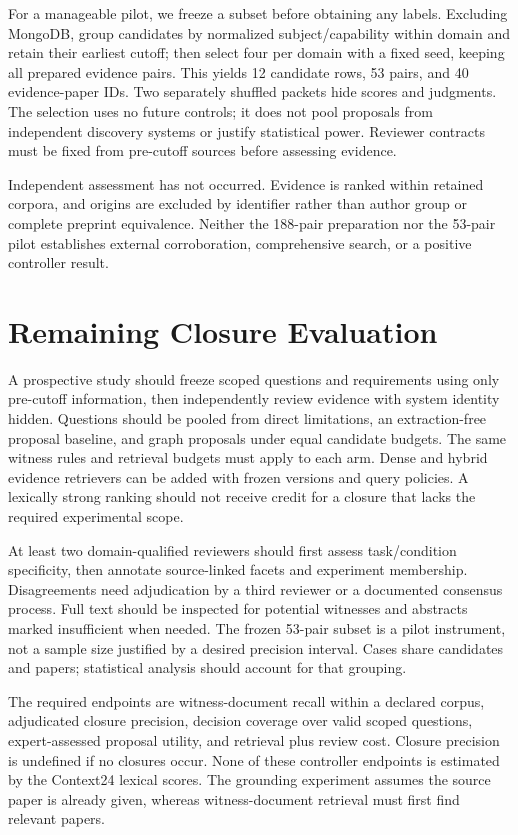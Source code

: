 \documentclass[runningheads]{llncs}
\begin{document}
For a manageable pilot, we freeze a subset before obtaining any labels. Excluding MongoDB, group candidates by normalized subject/capability within domain and retain their earliest cutoff; then select four per domain with a fixed seed, keeping all prepared evidence pairs. This yields 12 candidate rows, 53 pairs, and 40 evidence-paper IDs. Two separately shuffled packets hide scores and judgments. The selection uses no future controls; it does not pool proposals from independent discovery systems or justify statistical power. Reviewer contracts must be fixed from pre-cutoff sources before assessing evidence.

Independent assessment has not occurred. Evidence is ranked within retained corpora, and origins are excluded by identifier rather than author group or complete preprint equivalence. Neither the 188-pair preparation nor the 53-pair pilot establishes external corroboration, comprehensive search, or a positive controller result.

\section{Remaining Closure Evaluation}
A prospective study should freeze scoped questions and requirements using only pre-cutoff information, then independently review evidence with system identity hidden. Questions should be pooled from direct limitations, an extraction-free proposal baseline, and graph proposals under equal candidate budgets. The same witness rules and retrieval budgets must apply to each arm. Dense and hybrid evidence retrievers can be added with frozen versions and query policies. A lexically strong ranking should not receive credit for a closure that lacks the required experimental scope.

At least two domain-qualified reviewers should first assess task/condition specificity, then annotate source-linked facets and experiment membership. Disagreements need adjudication by a third reviewer or a documented consensus process. Full text should be inspected for potential witnesses and abstracts marked insufficient when needed. The frozen 53-pair subset is a pilot instrument, not a sample size justified by a desired precision interval. Cases share candidates and papers; statistical analysis should account for that grouping.

The required endpoints are witness-document recall within a declared corpus, adjudicated closure precision, decision coverage over valid scoped questions, expert-assessed proposal utility, and retrieval plus review cost. Closure precision is undefined if no closures occur. None of these controller endpoints is estimated by the Context24 lexical scores. The grounding experiment assumes the source paper is already given, whereas witness-document retrieval must first find relevant papers.
\end{document}
